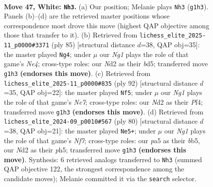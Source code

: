 \documentclass[11pt]{article}
\begin{document}
\clearpage

\begin{figure}[p]\centering
\begin{subfigure}{0.46\textwidth}\centering
\resizebox{\linewidth}{!}{%
\newchessgame
\chessboard[
  setfen={1r6/8/1pb4k/p1p1r3/8/2P2pP1/1K1N3P/6NR w - - 0 47},
  showmover=false,
  pgfstyle=straightmove, color=movearrow, markmove={g1-h3}
]}
\caption{}
\end{subfigure}\hfill
\begin{subfigure}{0.46\textwidth}\centering
\resizebox{\linewidth}{!}{%
\newchessgame
\chessboard[
  setfen={4r3/p6p/1pP5/3Bn1k1/1P6/P4p2/2R5/5K2 b - - 0 43},
  showmover=false,
  pgfstyle=straightmove, color=movearrow, markmove={e5-g4}
]}
\caption{}
\end{subfigure}
\\[4pt]
\begin{subfigure}{0.46\textwidth}\centering
\resizebox{\linewidth}{!}{%
\newchessgame
\chessboard[
  setfen={3r4/R3N1pk/5p1p/3p3P/5P2/2b3P1/6K1/8 w - - 2 47},
  showmover=false,
  pgfstyle=straightmove, color=movearrow, markmove={e7-f5}
]}
\caption{}
\end{subfigure}\hfill
\begin{subfigure}{0.46\textwidth}\centering
\resizebox{\linewidth}{!}{%
\newchessgame
\chessboard[
  setfen={8/2R2N1k/pr2p2p/1b5p/8/P3P3/6P1/6K1 w - - 0 41},
  showmover=false,
  pgfstyle=straightmove, color=movearrow, markmove={f7-e5}
]}
\caption{}
\end{subfigure}
\caption{\textbf{Move 47, White: \texttt{Nh3}.} (a) Our position; Melanie plays \texttt{Nh3} (\texttt{g1h3}). Panels (b)--(d) are the retrieved master positions whose correspondence most drove this move (highest QAP objective among those that transfer to it). (b) Retrieved from \texttt{lichess\_elite\_2025-11\_p0000\#3371} (ply 85) [structural distance $d$=38, QAP obj=35]: the master played \texttt{Ng4}; under $\mu$ our \emph{Ng1} plays the role of that game's \emph{Ne4}; cross-type roles: our \emph{N}d2 as their \emph{b}d5; transferred move \texttt{g1h3} \textbf{(endorses this move)}. (c) Retrieved from \texttt{lichess\_elite\_2025-11\_p0000\#835} (ply 92) [structural distance $d$=35, QAP obj=22]: the master played \texttt{Nf5}; under $\mu$ our \emph{Ng1} plays the role of that game's \emph{Ne7}; cross-type roles: our \emph{N}d2 as their \emph{P}f4; transferred move \texttt{g1h3} \textbf{(endorses this move)}. (d) Retrieved from \texttt{lichess\_elite\_2024-09\_p0010\#567} (ply 80) [structural distance $d$=38, QAP obj=21]: the master played \texttt{Ne5+}; under $\mu$ our \emph{Ng1} plays the role of that game's \emph{Nf7}; cross-type roles: our \emph{p}a5 as their \emph{b}b5, our \emph{N}d2 as their \emph{p}h5; transferred move \texttt{g1h3} \textbf{(endorses this move)}. Synthesis: 6 retrieved analogs transferred to \texttt{Nh3} (summed QAP objective 122, the strongest correspondence among the candidate moves); Melanie committed it via the \texttt{search} selector.}
\label{fig:thought-m92}
\end{figure}
\end{document}
